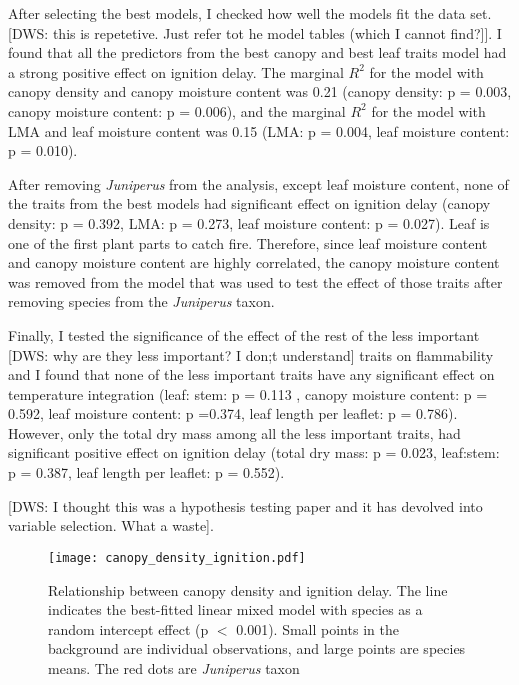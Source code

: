 \documentclass[12pt]{report}
\begin{document}
After selecting the best models, I checked how well the models fit the data set.  [DWS: this is repetetive. Just refer tot he model tables (which I cannot find?]]. I found that all the predictors from the best canopy and best leaf traits model had a strong positive effect on ignition delay. The marginal $R^2$ for the model with canopy density and canopy moisture content was 0.21 (canopy density: p = 0.003, canopy moisture content: p = 0.006), and the marginal $R^2$ for the model with LMA and leaf moisture content was 0.15 (LMA: p = 0.004, leaf moisture content: p = 0.010). \

After removing \emph{Juniperus} from the analysis, except leaf moisture content, none of the traits from the best models had significant effect on ignition delay (canopy density: p = 0.392,
LMA: p = 0.273, leaf moisture content: p = 0.027). Leaf is one of the first plant parts to catch fire.
Therefore, since leaf moisture content and canopy moisture content are highly correlated, the canopy moisture content was removed from the model that was used to test the effect of those traits after removing species from the \emph{Juniperus} taxon.



Finally, I tested the significance of the effect of the rest of the less important [DWS: why are they less important? I don;t understand] traits on flammability and I found that none of the less important traits have any significant effect on temperature integration (leaf: stem: p = 0.113 , canopy moisture content: p = 0.592, leaf moisture content: p =0.374, leaf length per leaflet: p = 0.786). However, only the total dry mass among all the less important traits, had significant positive effect on ignition delay (total dry mass: p = 0.023, leaf:stem: p = 0.387, leaf length per leaflet: p = 0.552).

[DWS: I thought this was a hypothesis testing paper and it has devolved into variable selection. What a waste].



\begin{figure}
    \centering
    \texttt{[image: canopy\_density\_ignition.pdf]}
    \caption{Relationship between canopy density and ignition delay. The line indicates the best-fitted linear mixed model with species as a random intercept effect (p $<$ 0.001). Small points in the background are individual observations, and large points are species means. The red dots are \emph{Juniperus} taxon}
\end{figure}
\end{document}
